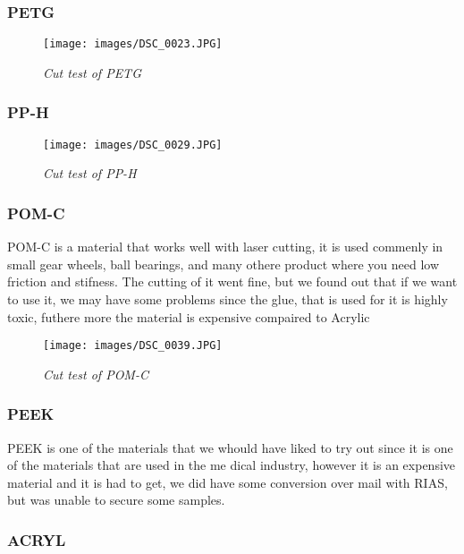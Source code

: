 \subsubsection{PETG}

\begin{figure}[h]
	\begin{center}
		\texttt{[image: images/DSC\_0023.JPG]}
		\caption{\small {\it {Cut test of PETG}}} \label{fig:explode}
	\end{center}
\end{figure}
\subsubsection{PP-H}
\begin{figure}[h]
	\begin{center}
		\texttt{[image: images/DSC\_0029.JPG]}
		\caption{\small {\it {Cut test of PP-H}}} \label{fig:explode}
	\end{center}
\end{figure}
\subsubsection{POM-C}
POM-C is a material that works well with laser cutting, it is used commenly in small gear wheels, ball bearings, and many othere product where you need low friction and stifness.
The cutting of it went fine, but we found out that if we want to use it, we may have some problems since the glue, that is used for it is highly toxic, futhere more the material is expensive compaired to Acrylic
\begin{figure}[h]
	\begin{center}
		\texttt{[image: images/DSC\_0039.JPG]}
		\caption{\small {\it {Cut test of POM-C}}} \label{fig:explode}
	\end{center}
\end{figure}

\subsubsection{PEEK}
PEEK is one of the materials that we whould have liked to try out since it is one of the materials that are used in the me dical industry, however it is an expensive material and it is had to get, we did have some conversion over mail with RIAS, but was unable to secure some samples.

\subsubsection{ACRYL}

